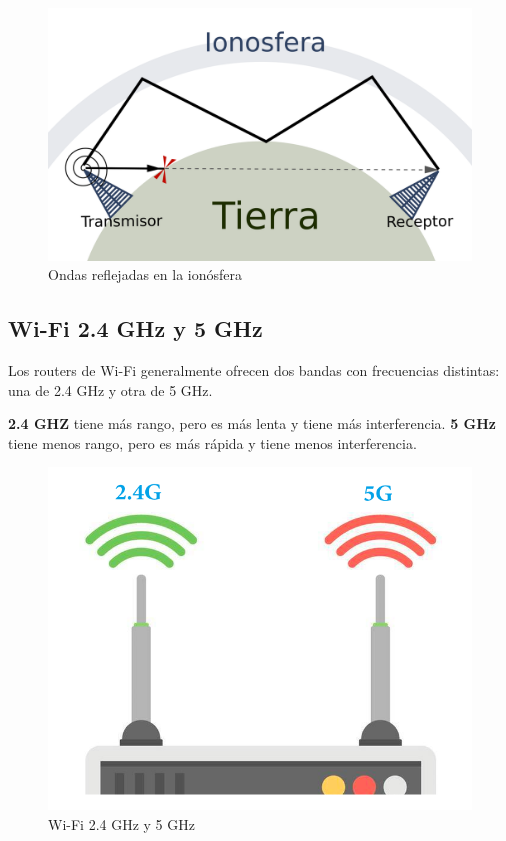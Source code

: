 \begin{figure}[H]
  \centering
  \includegraphics[scale=0.8]{imagenes/ionosfera_onda.png}
  \caption{Ondas reflejadas en la ionósfera\cite{wikiionosfera}}
\end{figure}

\subsection{Wi-Fi 2.4 GHz y 5 GHz}

Los routers de Wi-Fi generalmente ofrecen dos bandas con frecuencias distintas: una de 2.4 GHz y otra de 5 GHz.

\textbf{2.4 GHZ} tiene más rango, pero es más lenta y tiene más interferencia. \textbf{5 GHz} tiene menos rango, pero es más rápida y tiene menos interferencia.

\begin{figure}[H]
  \centering
  \includegraphics[scale=0.3]{imagenes/wifi.png}
  \caption{Wi-Fi 2.4 GHz y 5 GHz\cite{utecwifi}}
\end{figure}
